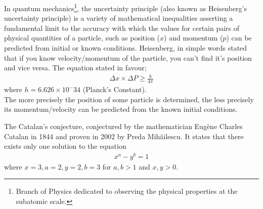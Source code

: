 \begin{phybox}{}
{In quantum mechanics\footnote{Branch of Physics dedicated to observing the physical properties at the subatomic scale.}, the uncertainty principle (also known as Heisenberg's uncertainty principle) is a variety of mathematical inequalities asserting a fundamental limit to the accuracy with which the values for certain pairs of physical quantities of a particle, such as position ($x$) and momentum ($p$) can be predicted from initial or known conditions. Heisenberg, in simple words stated that if you know velocity/momentum of the particle, you can't find it's position and vice versa. The equation stated in favour;
\begin{align*}
    \Delta x \times \Delta P \geq \frac{h}{4\pi}
\end{align*}
where  $h = 6.626 \times 10^-34$ (Planck's Constant).\\
The more precisely the position of some particle is determined, the less precisely its momentum/velocity can be predicted from the known initial conditions.}
\end{phybox}
\begin{mathbox}{}
{The Catalan's conjecture, conjectured by the mathematician Eugène Charles Catalan in 1844 and proven in 2002 by Preda Mihăilescu. It states that there  exists only one solution to the equation
\begin{align*} 
    x^a - y^b = 1
\end{align*} 
where $x=3, a=2, y=2, b=3$ for {$a,b > 1$} and {$x,y > 0$}.}
\end{mathbox}
